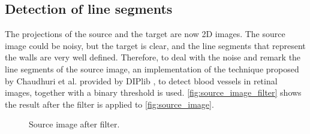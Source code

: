         \subsection{Detection of line segments}
            The projections of the source and the target are now 2D images. 
            The source image could be noisy, but the target is clear, and the line segments that represent the walls are very well defined.
            Therefore, to deal with the noise and remark the line segments of the source image, an implementation of the technique proposed 
            by Chaudhuri et al. \cite{Chaudhuri_1989_detection} provided by DIPlib \cite{DIPlib_library}, 
            to detect blood vessels in retinal images, together with a binary threshold is used.
            \autoref{fig:source_image_filter} shows the result after the filter is applied to \autoref{fig:source_image}.
            
            \begin{figure}[htp]
                \centering
                \caption{Source image after filter.}
                \label{fig:source_image_filter}
            \end{figure}

